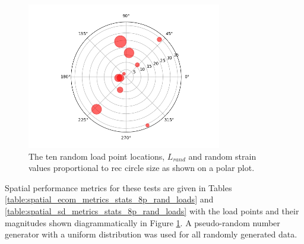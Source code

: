 \begin{figure}[H]
    \centering
    \includegraphics[width=8.5cm]{Figures/rand1_strain_aplc_points.jpg}
    \caption{The ten random load point locations, $L_{rand}$ and random strain values proportional to rec circle size as shown on a polar plot.}
    \label{fig:rand1_load_locs}
\end{figure}

Spatial performance metrics for these tests are given in Tables \ref{table:spatial_ecom_metrics_stats_8p_rand_loads} and \ref{table:spatial_sd_metrics_stats_8p_rand_loads} with the load points and their magnitudes shown diagrammatically in Figure \ref{fig:rand1_load_locs}. A pseudo-random number generator with a uniform distribution was used for all randomly generated data.


